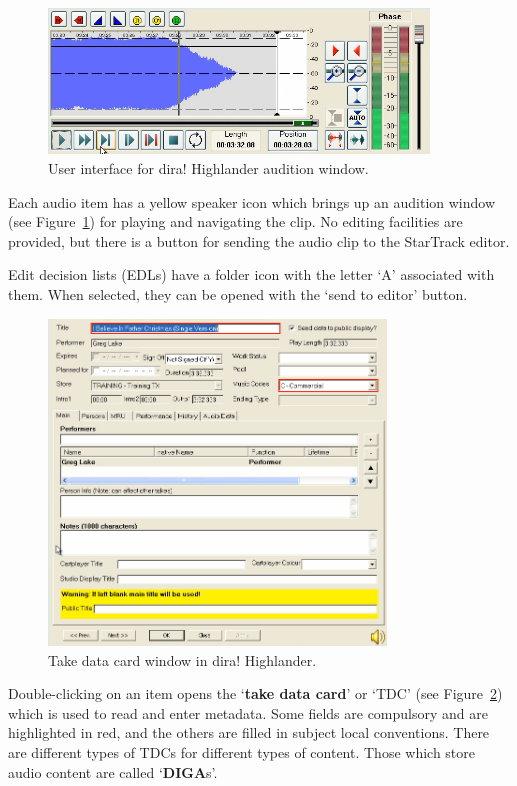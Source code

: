 \begin{figure}[p]
\centering
\includegraphics[width=0.9\textwidth]{figs/audition-interface.png}
\caption{User interface for dira! Highlander audition window.}
\label{fig:highlanderaudition}
\end{figure}

Each audio item has a yellow speaker icon which brings up an audition window
(see Figure~\ref{fig:highlanderaudition}) for playing and navigating the clip.
No editing facilities are provided, but there is a button for sending the audio
clip to the StarTrack editor.

Edit decision lists (EDLs) have a folder icon with the letter `A' associated
with them. When selected, they can be opened with the `send to editor' button.

\begin{figure}[p]
\centering
\includegraphics[width=0.8\textwidth]{figs/take-data-card.png}
\caption{Take data card window in dira! Highlander.}
\label{fig:takedatacard}
\end{figure}

Double-clicking on an item opens the `\textbf{take data card}' or `TDC' (see
Figure~\ref{fig:takedatacard}) which is used to read and enter metadata. Some
fields are compulsory and are highlighted in red, and the others are filled in
subject local conventions. There are different types of TDCs for different
types of content. Those which store audio content are called `\textbf{DIGA}s'. 

